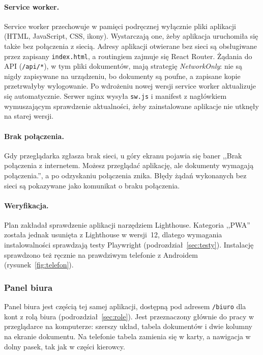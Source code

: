 \paragraph{Service worker.} Service worker przechowuje w pamięci podręcznej
wyłącznie pliki aplikacji (HTML, JavaScript, CSS, ikony). Wystarczają one,
żeby aplikacja uruchomiła się także bez połączenia z siecią. Adresy aplikacji otwierane bez
sieci są obsługiwane przez zapisany \texttt{index.html}, a routingiem zajmuje
się React Router. Żądania do API (\texttt{/api/*}), w tym pliki dokumentów,
mają strategię \emph{NetworkOnly}: nie są nigdy zapisywane na urządzeniu,
bo dokumenty są poufne, a zapisane kopie przetrwałyby wylogowanie. Po wdrożeniu
nowej wersji service worker aktualizuje się automatycznie. Serwer nginx
wysyła \texttt{sw.js} i manifest z nagłówkiem wymuszającym sprawdzenie
aktualności, żeby zainstalowane aplikacje nie utknęły na starej wersji.

\paragraph{Brak połączenia.} Gdy przeglądarka zgłasza brak sieci, u góry
ekranu pojawia się baner ,,Brak połączenia z internetem. Możesz przeglądać
aplikację, ale dokumenty wymagają połączenia.'', a po odzyskaniu połączenia
znika. Błędy żądań wykonanych bez sieci są pokazywane jako komunikat
o braku połączenia.

\paragraph{Weryfikacja.} Plan zakładał sprawdzenie aplikacji narzędziem
Lighthouse. Kategoria ,,PWA'' została jednak usunięta z Lighthouse w wersji~12,
dlatego wymagania instalowalności sprawdzają testy Playwright
(podrozdział~\ref{sec:testy}). Instalację sprawdzono też ręcznie na
prawdziwym telefonie z Androidem (rysunek~\ref{fig:telefon}).

\subsubsection{Panel biura}
\label{sec:panel-biura}

Panel biura jest częścią tej samej aplikacji, dostępną pod adresem
\texttt{/biuro} dla kont z rolą biura (podrozdział~\ref{sec:role}). Jest
przeznaczony głównie do pracy w przeglądarce na komputerze: szerszy układ,
tabela dokumentów i dwie kolumny na ekranie dokumentu. Na telefonie tabela
zamienia się w karty, a nawigacja w dolny pasek, tak jak w części kierowcy.

